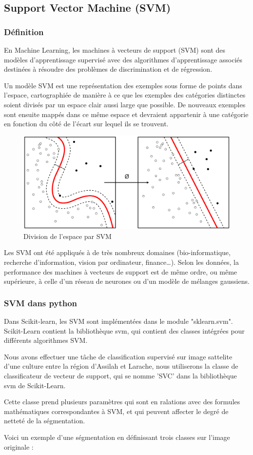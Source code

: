 \documentclass[12pt, openany]{report}
\begin{document}
\subsection{Support Vector Machine (SVM)}

\subsubsection{Définition}
En Machine Learning, les machines à vecteurs de support (SVM) sont des modèles d'apprentissage supervisé avec des algorithmes d'apprentissage associés destinées à résoudre des problèmes de discrimination et de régression. 
\par
Un modèle SVM est une représentation des exemples sous forme de points
dans l'espace, cartographiée de manière à ce que les exemples des catégories distinctes soient divisés par un espace clair aussi large que possible. De nouveaux exemples sont ensuite mappés dans ce même espace et devraient appartenir à une catégorie en fonction du côté de l'écart sur lequel ils se trouvent.
\begin{figure}[h]
\centering
\includegraphics[scale=0.2]{svm.png}
\caption{Division de l'espace par SVM}
\end{figure}

\par
Les SVM ont été appliqués à de très nombreux domaines (bio-informatique, recherche d'information, vision par ordinateur, finance…). Selon les données, la performance des machines à vecteurs de support est de même ordre, ou même supérieure, à celle d'un réseau de neurones ou d'un modèle de mélanges gaussiens.

\subsubsection{SVM dans python}
Dans Scikit-learn, les SVM sont implémentées dans le module "sklearn.svm".
Scikit-Learn contient la bibliothèque svm, qui contient des classes intégrées pour différents algorithmes SVM. 
\par
Nous avons effectuer une tâche de classification supervisé sur image sattelite d'une culture entre la région d'Assilah et Larache, nous utiliserons la classe de classificateur de vecteur de support, qui se nomme 'SVC' dans la bibliothèque svm de Scikit-Learn.
\par
Cette classe prend plusieurs paramètres qui sont en ralations avec des formules mathématiques correspondantes à SVM, et qui peuvent affecter le degré de netteté de la ségmentation.
\par
Voici un exemple d'une ségmentation en définissant trois classes sur l'image originale : 
\end{document}
